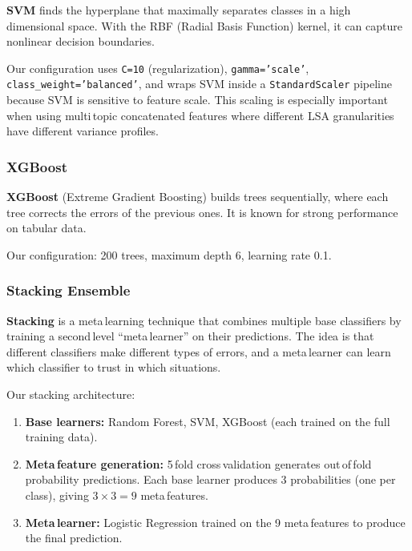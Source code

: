 \documentclass[12pt,a4paper,twoside]{article}
\theoremstyle{definition}
\begin{document}
\textbf{SVM} \citep{cortes1995support} finds the hyperplane that maximally separates classes in a high\,dimensional space. With the RBF (Radial Basis Function) kernel, it can capture nonlinear decision boundaries.

Our configuration uses \texttt{C=10} (regularization), \texttt{gamma='scale'}, \texttt{class\_weight='balanced'}, and wraps SVM inside a \texttt{StandardScaler} pipeline because SVM is sensitive to feature scale. This scaling is especially important when using multi\,topic concatenated features where different LSA granularities have different variance profiles.

\subsubsection{XGBoost}

\textbf{XGBoost} \citep{chen2016xgboost} (Extreme Gradient Boosting) builds trees sequentially, where each tree corrects the errors of the previous ones. It is known for strong performance on tabular data.

Our configuration: 200 trees, maximum depth 6, learning rate 0.1.

\subsubsection{Stacking Ensemble}

\textbf{Stacking} \citep{wolpert1992stacked} is a meta\,learning technique that combines multiple base classifiers by training a second\,level ``meta\,learner'' on their predictions. The idea is that different classifiers make different types of errors, and a meta\,learner can learn which classifier to trust in which situations.

Our stacking architecture:
\begin{enumerate}[leftmargin=2em]
    \item \textbf{Base learners:} Random Forest, SVM, XGBoost (each trained on the full training data).
    \item \textbf{Meta\,feature generation:} 5\,fold cross\,validation generates out\,of\,fold probability predictions. Each base learner produces 3 probabilities (one per class), giving $3 \times 3 = 9$ meta\,features.
    \item \textbf{Meta\,learner:} Logistic Regression trained on the 9 meta\,features to produce the final prediction.
\end{enumerate}
\end{document}
